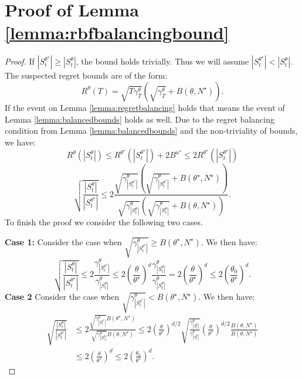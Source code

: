 \documentclass{article}
\theoremstyle{plain}
\theoremstyle{definition}
\theoremstyle{remark}
\theoremstyle{plain}
\begin{document}
\section{Proof of Lemma \ref{lemma:rbfbalancingbound}} \label{app:rbfbalancingbound_proof}
\rbfbalancingbound*
\begin{proof}
    If $|S_t^{\theta^\star}| \ge |S_t^{\theta}|$, the bound holds trivially. Thus we will assume $|S_t^{\theta^\star}| < |S_t^{\theta}|$. The suspected regret bounds are of the form:
    \begin{equation*}
        R^\theta(T) =  \sqrt{T\gamma_T^\theta} \left( \sqrt{\gamma_T^\theta} + B(\theta, N^\star) \right) .
    \end{equation*}
    If the event on Lemma \ref{lemma:regretbalancing} holds that means the event of Lemma \ref{lemma:balancedbounds} holds as well. Due to the regret balancing condition from Lemma \ref{lemma:balancedbounds} and the non-triviality of bounds, we have:
    \begin{equation*}
         R^{\theta}(|S_t^{\theta}|) \le  R^{\theta^\star}(|S_t^{\theta^\star}|) + 2B^{u^\star} \le  2R^{\theta^\star}(|S_t^{\theta^\star}|)
    \end{equation*}
    \begin{equation*}
         \sqrt{\frac{|S_t^{\theta}|}{|S_t^{\theta^\star}|}}  \le  2 \frac{ \sqrt{\gamma_{|S_t^{\theta^\star}|}^\theta} \left( \sqrt{\gamma_{|S_t^{\theta^\star}|}^\theta} + B(\theta^\star, N^\star) \right)}{ \sqrt{\gamma_{|S_t^{\theta}|}^\theta} \left( \sqrt{\gamma_{|S_t^{\theta}|}^\theta} + B(\theta, N^\star) \right)} .
    \end{equation*}
    To finish the proof we consider the following two cases.
    
    \textbf{Case 1:} Consider the case when $\sqrt{\gamma_{|S_t^{\theta^\star}|}^\theta} \ge B(\theta^\star, N^\star)$. We then have:
    \begin{equation*}
         \sqrt{\frac{|S_t^{\theta}|}{|S_t^{\theta^\star}|}}  \le  2 \frac{ \gamma_{|S_t^{\theta^\star}|}^\theta}{ \gamma_{|S_t^{\theta}|}^\theta} \le 2 \left(\frac{\theta}{\theta^\star} \right)^{d} \frac{ \gamma_{|S_t^{\theta}|}^\theta}{ \gamma_{|S_t^{\theta}|}^\theta} = 2 \left(\frac{\theta}{\theta^\star} \right)^{d} \le 2 \left(\frac{\theta_0}{\theta^\star} \right)^{d}.
    \end{equation*}
    \textbf{Case 2} Consider the case when $\sqrt{\gamma_{|S_t^{\theta^\star}|}^\theta} < B(\theta^\star, N^\star)$. We then have:
    \begin{align*}
         \sqrt{\frac{|S_t^{\theta}|}{|S_t^{\theta^\star}|}}  &\le  2 \frac{ \sqrt{\gamma_{|S_t^{\theta^\star}|}^\theta}B(\theta^\star, N^\star)}{ \sqrt{\gamma_{|S_t^{\theta}|}^\theta} B(\theta, N^\star)} \le  2 \left(\frac{\theta}{\theta^\star} \right)^{d/2} \sqrt{\frac{ \gamma_{|S_t^{\theta}|}^\theta}{ \gamma_{|S_t^{\theta}|}^\theta}} \left(\frac{\theta}{\theta^\star} \right)^{d / 2} \frac{B(\theta, N^\star)}{B(\theta, N^\star)} \\
         &\le 2 \left(\frac{\theta}{\theta^\star} \right)^{d} \le 2 \left(\frac{\theta_0}{\theta^\star} \right)^{d}.
    \end{align*}


\end{proof}
\end{document}
